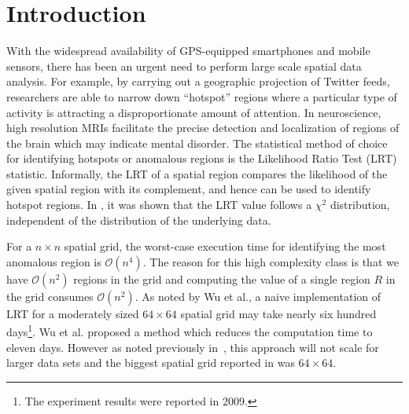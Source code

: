 \documentclass[AMA,LATO1COL]{WileyNJD-v2}
\newcommand\bigo{\mathcal O}
\begin{document}


\maketitle

\section{Introduction}\label{sec1}
With the widespread availability of GPS-equipped smartphones and mobile
sensors, there has been an urgent need to perform large scale spatial data analysis.
For example, by carrying
out a geographic projection of Twitter feeds, researchers are able to
narrow down ``hotspot'' regions where a particular type of activity is attracting a disproportionate  amount of attention. In neuroscience, high resolution MRIs facilitate the precise detection and localization of regions of the brain which may indicate mental disorder.
The statistical method of choice for identifying hotspots or anomalous regions
is the Likelihood Ratio Test (LRT) statistic.
Informally, the LRT of a spatial region compares the likelihood of the given spatial region with its complement, and hence can be used to identify hotspot regions. In \cite{chisquare}, it was shown that the LRT value follows a $\chi^{2}$ distribution, independent of the distribution of the underlying data.

\noindent For a $n\times n$ spatial grid, the worst-case execution time for identifying the most
anomalous region is $\bigo(n^4)$. The reason for this high complexity class is that we have $\bigo(n^2)$ regions in the grid and computing the value of a single region $R$ in the grid consumes $\bigo(n^2)$. As noted by Wu et al.\cite{jour}, a naive implementation of LRT for a moderately sized $64 \times 64$  spatial grid may take nearly six hundred days\footnote{The experiment results were  reported in  2009.}. Wu et al.\cite{jour} proposed a method which reduces the computation time to eleven days. However as noted previously in~\cite{ADMA}, this approach will not scale for larger data sets and the biggest spatial grid reported in\cite{jour} was $64 \times  64$.
\end{document}
